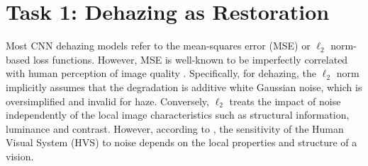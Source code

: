 \documentclass[10pt,twocolumn,letterpaper]{article}
\begin{document}






\section{Task 1: Dehazing as Restoration}

Most CNN dehazing models \cite{cai2016dehazenet,ren2016single,li2017aod} refer to the mean-squares error (MSE) or $\ell_2$ norm-based loss functions. However, MSE is well-known to be imperfectly correlated with human perception of image quality \cite{zhang2012comprehensive,zhao2017loss}. Specifically, for dehazing, 
the $\ell_2$ norm implicitly assumes that the degradation is additive white Gaussian noise, which is oversimplified and invalid for haze. %
Conversely, $\ell_2$ treats the impact of noise independently of the local image characteristics such as structural information, luminance and contrast. However, according to \cite{wang2004image}, the sensitivity of the Human Visual System (HVS) to noise depends on the local properties and structure of a vision. 
 
\end{document}
